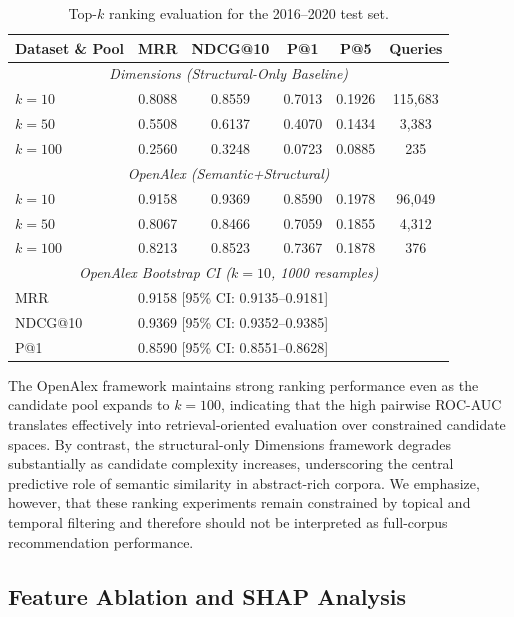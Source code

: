 \documentclass[11pt,a4paper]{article}
\begin{document}
\begin{table}[H]
\centering
\caption{Top-\(k\) ranking evaluation for the 2016--2020 test set.}
\label{tab:ranking}
\begin{tabular}{lccccc}
\toprule
\textbf{Dataset \& Pool} & \textbf{MRR} & \textbf{NDCG@10} & \textbf{P@1} & \textbf{P@5} & \textbf{Queries} \\
\midrule
\multicolumn{6}{c}{\textit{Dimensions (Structural-Only Baseline)}} \\
\(k=10\) & 0.8088 & 0.8559 & 0.7013 & 0.1926 & 115,683 \\
\(k=50\) & 0.5508 & 0.6137 & 0.4070 & 0.1434 & 3,383 \\
\(k=100\) & 0.2560 & 0.3248 & 0.0723 & 0.0885 & 235 \\
\midrule
\multicolumn{6}{c}{\textit{OpenAlex (Semantic+Structural)}} \\
\(k=10\) & 0.9158 & 0.9369 & 0.8590 & 0.1978 & 96,049 \\
\(k=50\) & 0.8067 & 0.8466 & 0.7059 & 0.1855 & 4,312 \\
\(k=100\) & 0.8213 & 0.8523 & 0.7367 & 0.1878 & 376 \\
\midrule
\multicolumn{6}{c}{\textit{OpenAlex Bootstrap CI (\(k=10\), 1000 resamples)}} \\
MRR & \multicolumn{5}{l}{0.9158 [95\% CI: 0.9135--0.9181]} \\
NDCG@10 & \multicolumn{5}{l}{0.9369 [95\% CI: 0.9352--0.9385]} \\
P@1 & \multicolumn{5}{l}{0.8590 [95\% CI: 0.8551--0.8628]} \\
\bottomrule
\end{tabular}
\end{table}

The OpenAlex framework maintains strong ranking performance even as the candidate pool expands to \(k=100\), indicating that the high pairwise ROC-AUC translates effectively into retrieval-oriented evaluation over constrained candidate spaces. By contrast, the structural-only Dimensions framework degrades substantially as candidate complexity increases, underscoring the central predictive role of semantic similarity in abstract-rich corpora. We emphasize, however, that these ranking experiments remain constrained by topical and temporal filtering and therefore should not be interpreted as full-corpus recommendation performance.

\subsection{Feature Ablation and SHAP Analysis}
\label{sec:ablation}
\end{document}

